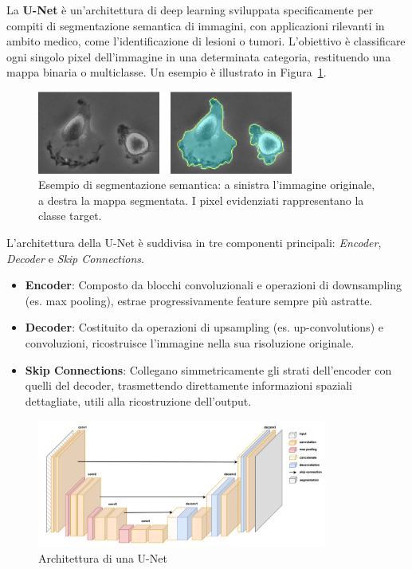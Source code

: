 La \textbf{U-Net} è un’architettura di deep learning sviluppata specificamente per compiti di segmentazione semantica di immagini, con applicazioni rilevanti in ambito medico, come l’identificazione di lesioni o tumori. L’obiettivo è classificare ogni singolo pixel dell’immagine in una determinata categoria, restituendo una mappa binaria o multiclasse. Un esempio è illustrato in Figura~\ref{fig:cell}.

\begin{figure}[!ht]
\centering
\includegraphics[width=0.75\textwidth]{figure/Cells.png}
\caption{Esempio di segmentazione semantica: a sinistra l'immagine originale, a destra la mappa segmentata. I pixel evidenziati rappresentano la classe target.}
\label{fig:cell}
\end{figure}

L’architettura della U-Net è suddivisa in tre componenti principali: \emph{Encoder}, \emph{Decoder} e \emph{Skip Connections}.

\begin{itemize}
\item \textbf{Encoder}: Composto da blocchi convoluzionali e operazioni di downsampling (es. max pooling), estrae progressivamente feature sempre più astratte.
\item \textbf{Decoder}: Costituito da operazioni di upsampling (es. up-convolutions) e convoluzioni, ricostruisce l’immagine nella sua risoluzione originale.
\item \textbf{Skip Connections}: Collegano simmetricamente gli strati dell’encoder con quelli del decoder, trasmettendo direttamente informazioni spaziali dettagliate, utili alla ricostruzione dell’output.
\end{itemize}

\begin{figure}[!ht]
\centering
\includegraphics[width=0.85\textwidth]{figure/UNet.png}
\caption{Architettura di una U-Net}
\label{fig:unet}
\end{figure}

